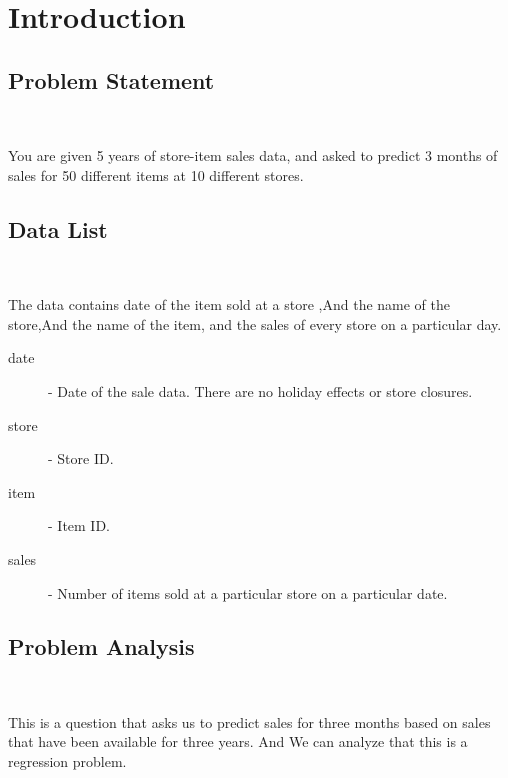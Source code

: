 \section{Introduction}\label{sec-intro}





\subsection{Problem Statement}
\

You are given 5 years of store-item sales data, and asked to predict 3 months of sales 
for 50 different items at 10 different stores.
\subsection{Data List}
\

The data contains date of the item sold at a store ,And the name of the store,And the name of the item,
and the sales of every store on a particular day.
\begin{description}
  \item [date] - Date of the sale data. There are no holiday effects or store closures.
  \item [store] - Store ID.
  \item [item] - Item ID.
  \item [sales] - Number of items sold at a particular store on a particular date.
\end{description}

\subsection{Problem Analysis}
\

This is a question that asks us to predict sales for three months
 based on sales that have been available for three years. And We can
 analyze that this is a regression problem.

